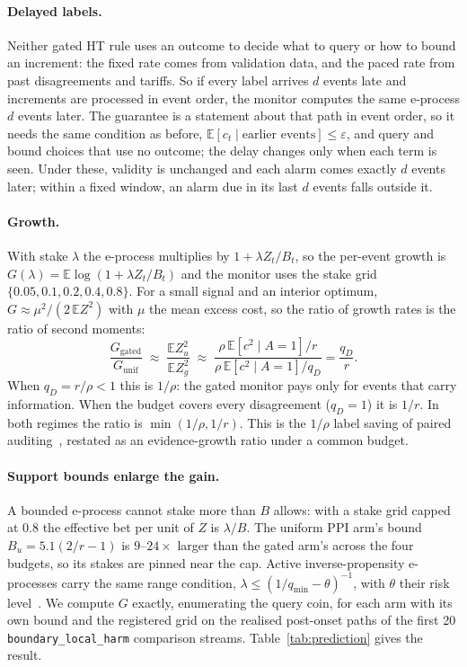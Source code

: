 \paragraph{Delayed labels.}
Neither gated HT rule uses an outcome to decide what to query or how to bound an increment: the fixed rate comes from validation data, and the paced rate from past disagreements and tariffs.
So if every label arrives $d$ events late and increments are processed in event order, the monitor computes the same e-process $d$ events later.
The guarantee is a statement about that path in event order, so it needs the same condition as before, $\mathbb E[c_t\mid\text{earlier events}]\le\varepsilon$, and query and bound choices that use no outcome; the delay changes only when each term is seen.
Under these, validity is unchanged and each alarm comes exactly $d$ events later; within a fixed window, an alarm due in its last $d$ events falls outside it.

\paragraph{Growth.}
With stake $\lambda$ the e-process multiplies by $1+\lambda Z_t/B_t$, so the per-event growth is
$G(\lambda)=\mathbb E\log(1+\lambda Z_t/B_t)$ and the monitor uses the stake grid $\{0.05,0.1,0.2,0.4,0.8\}$.
For a small signal and an interior optimum, $G\approx\mu^2/(2\,\mathbb E Z^2)$ with $\mu$ the mean excess cost, so the ratio of growth rates is
the ratio of second moments:
\[
\frac{G_{\mathrm{gated}}}{G_{\mathrm{unif}}}\;\approx\;\frac{\mathbb E Z_u^2}{\mathbb E Z_g^2}\;\approx\;
\frac{\rho\,\mathbb E[c^2\mid A{=}1]/r}{\rho\,\mathbb E[c^2\mid A{=}1]/q_D}=\frac{q_D}{r}.
\]
When $q_D=r/\rho<1$ this is $1/\rho$: the gated monitor pays only for events that carry information.
When the budget covers every disagreement ($q_D=1$) it is $1/r$. In both regimes the ratio is
$\min(1/\rho,1/r)$. This is the $1/\rho$ label saving of paired auditing~\citep{discern}, restated as an evidence-growth ratio under a common budget.

\paragraph{Support bounds enlarge the gain.}
A bounded e-process cannot stake more than $B$ allows: with a stake grid capped at $0.8$ the effective bet per unit of $Z$ is $\lambda/B$.
The uniform PPI arm's bound $B_u=5.1(2/r-1)$ is $9$--$24\times$ larger than the gated arm's across the four budgets, so its stakes are
pinned near the cap. Active inverse-propensity e-processes carry the same range condition, $\lambda\le(1/q_{\min}-\theta)^{-1}$, with $\theta$ their risk level~\citep{xu2024active}.
We compute $G$ exactly, enumerating the query coin, for each arm with its own bound and the registered grid on the realised post-onset
paths of the first 20 \texttt{boundary\_local\_harm} comparison streams. Table~\ref{tab:prediction} gives the result.

